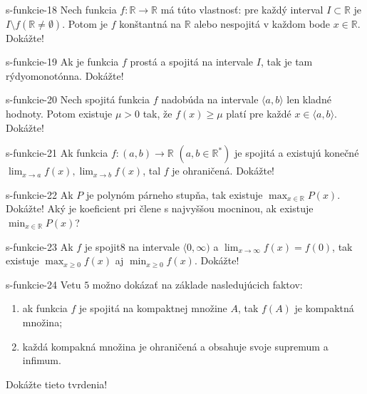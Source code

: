 	\begin{defproblem}{s-funkcie-18}
	Nech funkcia $f: \mathbb{R} \rightarrow \mathbb{R}$ má túto vlastnosť: pre každý interval $I \subset \mathbb{R}$ je $I \setminus f(\mathbb{R} \neq \emptyset)$. Potom je $f$ konštantná na $\mathbb{R}$ alebo nespojitá v každom bode $x \in \mathbb{R}$. Dokážte!
	\end{defproblem}
	
	\begin{defproblem}{s-funkcie-19}
	Ak je funkcia $f$ prostá a spojitá na intervale $I$, tak je tam rýdyomonotónna. Dokážte!
	\end{defproblem}
	
	\begin{defproblem}{s-funkcie-20}
	Nech spojitá funkcia $f$ nadobúda na intervale $\langle a,b \rangle$ len kladné hodnoty. Potom existuje $\mu > 0$ tak, že $f(x) \geq \mu$ platí pre každé $x \in \langle a,b \rangle$. Dokážte!
	\end{defproblem}
	
	\begin{defproblem}{s-funkcie-21}
	Ak funkcia $f: (a,b) \rightarrow \mathbb{R}$ $(a,b\in \mathbb{R^*})$ je spojitá a existujú konečné $\lim_{x \rightarrow a}f(x),\lim_{x \rightarrow b}f(x)$, tal $f$ je ohraničená. Dokážte!
	\end{defproblem}
	
	\begin{defproblem}{s-funkcie-22}
	Ak $P$ je polynóm párneho stupňa, tak existuje $\max_{x \in \mathbb{R}} P(x)$. Dokážte! Aký je koeficient pri člene s najvyššou mocninou, ak existuje $\min_{x \in \mathbb{R}} P(x)$?
	\end{defproblem}
	
	\begin{defproblem}{s-funkcie-23}
	Ak $f$ je spojit8 na intervale $\langle0,\infty)$ a $\lim_{x \rightarrow \infty} f(x)=f(0)$, tak existuje $\max_{x \geq 0} f(x)$ aj $\min_{x \geq 0}f(x)$. Dokážte!
	\end{defproblem}
	
	\begin{defproblem}{s-funkcie-24}
	Vetu $5$ možno dokázať na základe nasledujúcich faktov:
	\begin{enumerate}
	\item ak funkcia $f$ je spojitá na kompaktnej množine $A$, tak $f(A)$ je kompaktná množina;
	\item každá kompakná množina je ohraničená a obsahuje svoje supremum a infimum.
	\end{enumerate}
	Dokážte tieto tvrdenia!
	\end{defproblem}
	
